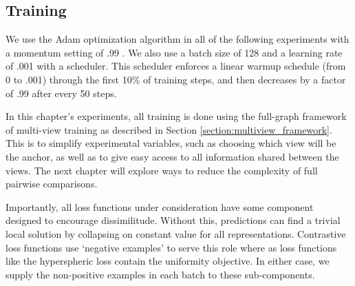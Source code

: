 %
%
\subsection{Training}
\label{section:obj_exp_training}
We use the Adam optimization algorithm in all of the following experiments with a momentum setting of .99 .
We also use a batch size of 128 and a learning rate of .001 with a scheduler. 
This scheduler enforces a linear warmup schedule (from 0 to .001) through the first 10\% of training steps, and then decreases by a factor of .99 after every 50 steps.

In this chapter's experiments, all training is done using the full-graph framework of multi-view training as described in Section \ref{section:multiview_framework}.
This is to simplify experimental variables, such as choosing which view will be the anchor, as well as to give easy access to all information shared between the views.
The next chapter will explore ways to reduce the complexity of full pairwise comparisons.

Importantly, all loss functions under consideration have some component designed to encourage dissimilitude. 
Without this, predictions can find a trivial local solution by collapsing on constant value for all representations.
Contrastive loss functions use `negative examples' to serve this role where as loss functions like the hyperspheric loss contain the uniformity objective.
In either case, we supply the non-positive examples in each batch to these sub-components. 

